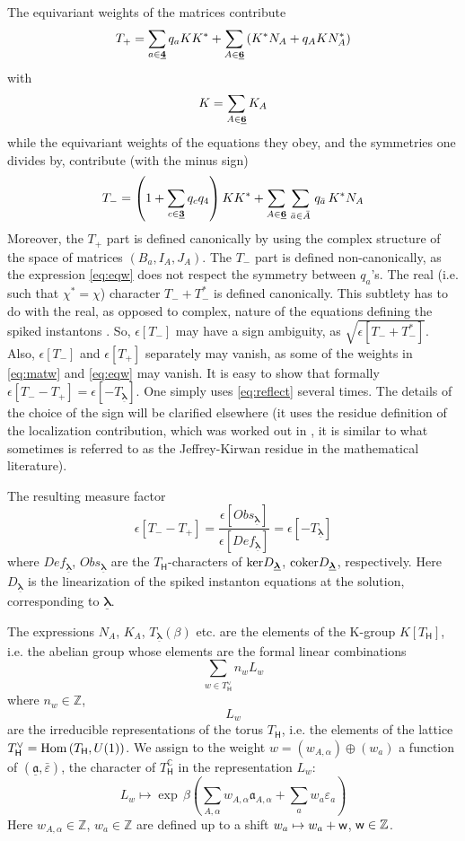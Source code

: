 \documentclass[12pt]{amsart}
\newcommand {\3}{\underline{\bf 3}}
\newcommand {\4}{\underline{\bf 4}}
\newcommand {\6}{\underline{\bf 6}}
\newcommand{\beq}{\begin{equation}}
\newcommand{\eeq}{\end{equation}}
\newcommand {\BC}   {\mathbb C}
\newcommand {\Hf} {\mathsf{H}}
\newcommand {\ba}  {\underline{\ac}}
\newcommand {\bla} {\underline{\boldsymbol{\lambda}}}
\newcommand {\BZ}   {\mathbb Z}
\newcommand {\ac} {\mathfrak{a}}
\newcommand{\ve}{\varepsilon}
\newcommand{\ep}{\epsilon}
\begin{document}
{}The equivariant weights of the matrices contribute
\beq
T_{+} = \sum_{a\in \4}  q_{a} K  K^{*} +  \sum_{A \in \6} \left( K^{*}N_{A} + q_{A} K N_{A}^{*}\right) 
\label{eq:matw}
\eeq
with
\beq
K = \sum_{A \in \6} K_{A}
\eeq
while the equivariant weights of the equations they obey, and the symmetries one divides by, contribute (with the minus sign)
\beq
T_{-} = \left( 1 + \sum_{c \in {\3}} q_{c}q_{4} \right)   K K^{*} + \sum_{A \in  \6} \, \sum_{{\bar a} \in {\bar A}} \, q_{\bar a}\, K^{*}N_{A}  
\label{eq:eqw}
\eeq
Moreover, the $T_{+}$ part is defined canonically by using the complex structure of the space of matrices $(B_{a}, I_{A}, J_{A})$. The $T_{-}$ part is defined non-canonically, as the expression \eqref{eq:eqw} does not respect the symmetry between $q_{a}$'s. The real (i.e. such that ${\chi}^{*}= {\chi}$) character $T_{-} + T_{-}^{*}$ is defined canonically. This subtlety has to do with the real, as opposed to complex, nature of the equations defining the spiked instantons  
\cite{Nekrasov:2016qym}. So, 
${\ep}[T_{-}]$ may have a sign ambiguity, as $\sqrt{{\ep}[T_{-} + T_{-}^{*}]}$. Also, ${\ep}[T_{-}]$ and ${\ep}[T_{+}]$ separately may vanish, as some of the weights in \eqref{eq:matw} and \eqref{eq:eqw} may vanish. It is easy to show that formally ${\ep}[T_{-} - T_{+}] = {\ep}[ -T_{\bla}]$. One simply uses \eqref{eq:reflect} several times.  
The details of the choice of the sign will be clarified elsewhere (it uses the residue definition of the localization contribution, which was worked out in \cite{Moore:1997dj}, it is similar to what sometimes is referred to as the Jeffrey-Kirwan residue in the mathematical literature). 

{}The resulting measure factor
\beq
{\ep}[T_{-} - T_{+}] = \frac{{\ep}[Obs_{\bla}]}{{\ep}[Def_{\bla}]} =  {\ep} [ - T_{\bla} ]
\eeq
where $Def_{\bla}$, $Obs_{\bla}$ are the $T_{\Hf}$-characters of  ${\rm ker}D_{\bla}$, ${\rm coker}D_{\bla}$, respectively. Here $D_{\bla}$ is the linearization of the spiked instanton equations at the solution, corresponding to $\bla$. 


The expressions $N_A$, $K_A$, $T_{\bla} ({\beta})$ etc. are the elements of the K-group $K[T_{\Hf}]$, i.e. the abelian group whose elements are the formal linear combinations
\beq
\sum_{w \in T_{\Hf}^{\vee}} n_{w} L_{w}
\label{eq:kgrt}
\eeq
where $n_{w} \in {\BZ}$, 
\beq
L_{w}
\label{eq:irrept}
\eeq are the irreducible representations of the torus $T_{\Hf}$, i.e. the elements of the lattice $T_{\Hf}^{\vee} = {\rm Hom} \left( T_{\Hf}, U(1) \right)$. We assign to the weight $w = (w_{A, \alpha}) \oplus (w_{a})$ a function of $({\ba}, {\bar\ve})$, the character of $T_{\Hf}^{\BC}$ in the representation $L_w$:
\beq 
L_{w} \mapsto {\exp} \, {\beta} \left( \sum\limits_{A, \alpha} w_{A, \alpha}{\ac}_{A, \alpha} + 
\sum\limits_{a} w_{a} {\ve}_{a} \right)
\label{eq:chiw}
\eeq
Here $w_{A, \alpha} \in {\BZ}$, $w_{a} \in {\BZ}$ are defined up to a shift $w_{a} \mapsto w_{a} + {\sf w}$, ${\sf w} \in {\BZ}$. 
\end{document}

